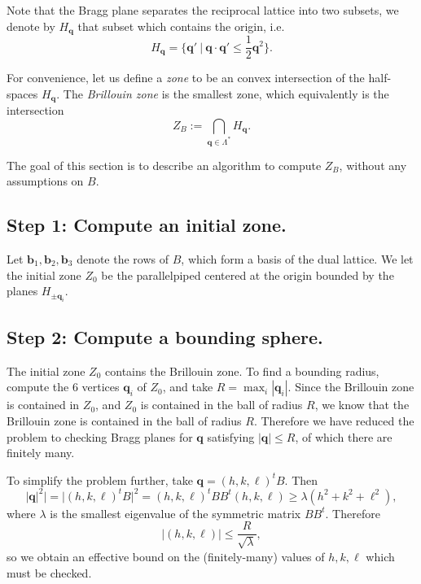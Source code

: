 \documentclass{report}
\newcommand{\bb}{\mathbf{b}}
\newcommand{\bq}{\mathbf{q}}
\begin{document}
Note that the Bragg plane separates the reciprocal lattice into two subsets, we denote by $H_\bq$ that subset
which contains the origin, i.e.
\[ H_\bq = \{ \bq' \ | \ \bq \cdot \bq' \leq \frac{1}{2} \bq^2 \}. \]


For convenience, let us define a \emph{zone} to be an convex intersection of the half-spaces $H_\bq$.
The \emph{Brillouin zone} is the smallest zone, which equivalently is the intersection
\[ Z_B :=\bigcap_{\bq \in \Lambda^\ast} H_\bq. \]

The goal of this section is to describe an algorithm to compute $Z_B$, without any assumptions on $B$.

\subsection{Step 1: Compute an initial zone.}
Let $\bb_1, \bb_2, \bb_3$ denote the rows of $B$, which form a basis of the dual lattice.
We let the initial zone $Z_0$ be the parallelpiped centered at the origin bounded by the planes
$H_{\pm \bq_i}$.

\subsection{Step 2: Compute a bounding sphere.}
The initial zone $Z_0$ contains the Brillouin zone. To find a bounding radius, compute the 6 vertices $\bq_i$ of $Z_0$,
and take $R = \max_i |\bq_i|$. Since the Brillouin zone is contained in $Z_0$, and $Z_0$ is contained in the ball of radius $R$,
we know that the Brillouin zone is contained in the ball of radius $R$. Therefore we have reduced the problem to checking
Bragg planes for $\bq$ satisfying $|\bq| \leq R$, of which there are finitely many.

To simplify the problem further, take $\bq = (h,k,\ell)^t B$. Then
\[ |\bq|^2| = |(h,k,\ell)^t B|^2 = (h,k,\ell)^t B B^t (h,k,\ell) \geq \lambda (h^2 + k^2 + \ell^2),\]
where $\lambda$ is the smallest eigenvalue of the symmetric matrix $B B^t$. Therefore
\[ |(h,k,\ell)| \leq \frac{R}{\sqrt\lambda}, \]
so we obtain an effective bound on the (finitely-many) values of $h,k,\ell$ which must be checked.
\end{document}
